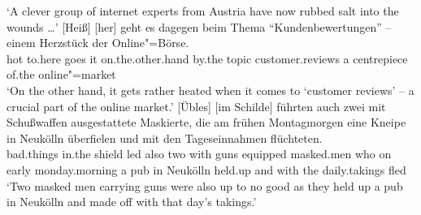 \glt `A clever group of internet experts from Austria have now rubbed salt into the wounds \ldots'
\ex 
\gll {}[Heiß] [her] geht es dagegen beim Thema "`Kundenbewertungen"'  -- einem Herzstück der Online"=Börse.\footnotemark\\
	  \spacebr{}hot \spacebr{}to.here goes it on.the.other.hand by.the topic customer.reviews {} a centrepiece of.the online"=market\\
\glt `On the other hand, it gets rather heated when it comes to `customer reviews' -- a crucial part of the online market.'
\ex 
\gll {}[Übles] [im Schilde] führten auch zwei mit Schußwaffen ausgestattete Maskierte, die am frühen Montagmorgen eine Kneipe in Neukölln überfielen und mit den Tageseinnahmen flüchteten.\footnotemark\\
     \spacebr{}bad.things  \spacebr{}in.the shield led also two with guns equipped masked.men who on early monday.morning a pub in Neukölln held.up and with the daily.takings fled\\
\glt `Two masked men carrying guns were also up to no good as they held up a pub in Neukölln and made off with that day's takings.'
\zl


